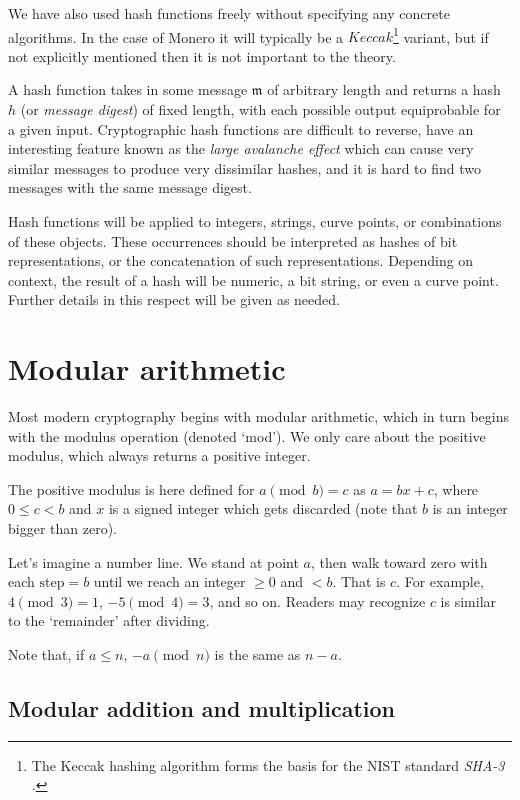 We have also used hash functions freely without specifying any concrete algorithms. In the case of Monero it will typically be a \(\mathit{Keccak}\)\footnote{\label{kekkak_note}The Keccak hashing algorithm forms the basis for the NIST standard {\em SHA-3} \cite{nist-sha3}.} variant, but if not explicitly mentioned then it is not important to the theory. 

A hash function takes in some message $\mathfrak{m}$ of arbitrary length and returns a hash $h$ (or {\em message digest}) of fixed length, with each possible output equiprobable for a given input. Cryptographic hash functions are difficult to reverse, have an interesting feature known as the {\em large avalanche effect} which can cause very similar messages to produce very dissimilar hashes, and it is hard to find two messages with the same message digest.

Hash functions will be applied to integers, strings, curve points, or combinations of these objects. These occurrences should be interpreted as hashes of bit representations, or the concatenation of such representations. Depending on context, the result of a hash will be numeric, a bit string, or even a curve point. Further details in this respect will be given as needed.



\section{Modular arithmetic}

Most modern cryptography begins with modular arithmetic, which in turn begins with the modulus operation (denoted `mod'). We only care about the positive modulus, which always returns a positive integer.

The positive modulus is here defined for $a \pmod b = c$ as $a=bx+c$, where $0\leq{c}<{b}$ and $x$ is a signed integer which gets discarded (note that $b$ is an integer bigger than zero).

Let's imagine a number line. We stand at point $a$, then walk toward zero with each $\text{step} =b$ until we reach an integer $\geq{0}$ and $<b$. That is $c$. For example, $4 \pmod 3 = 1$, $-5 \pmod 4 = 3$, and so on. Readers may recognize $c$ is similar to the `remainder' after dividing.

Note that, if $a \leq n$, $-a \pmod n$ is the same as $n - a$.

\subsection{Modular addition and multiplication}
\label{subsec:modular-addition-multiplication}

